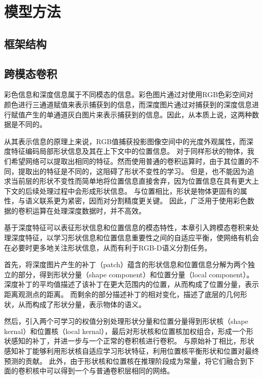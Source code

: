 \section{模型方法}



\subsection{框架结构}



\subsection{跨模态卷积}
彩色信息和深度信息属于不同模态的信息。彩色图片通过对使用RGB色彩空间对颜色进行三通道赋值来表示捕获到的信息，而深度图片通过对捕获到的深度信息进行赋值产生的单通道灰白图片来表示捕获到的信息。因此，从本质上说，这两种数据是不同的。

从其表示信息的原理上来说，RGB值捕获投影图像空间中的光度外观属性，而深度特征编码局部形状信息及其在上下文中的位置信息。
对于同样形状的物体，我们希望网络可以提取出相同的特征。然而使用普通的卷积运算时，由于其位置的不同，提取出的特征是不同的，这阻碍了形状不变性的学习。
但是，也不能因为追求当前层的形状不变性而简单地将位置信息直接舍弃，因为位置信息在具有更大上下文的后续处理过程中会形成形状信息。
与位置相比，形状是物体更固有的属性，与语义联系更为紧密，因而对分割精度更关键。
因此，广泛用于使用彩色数据的卷积运算在处理深度数据时，并不高效。


基于深度特征可以表征形状信息和位置信息的模态特性，本章引入跨模态卷积来处理深度特征，以学习形状信息和位置信息重要性之间的自适应平衡，使网络有机会在必要时更多地关注形状信息，从而有利于RGB-D语义分割任务。

首先，将深度图片产生的补丁（patch）蕴含的形状信息和位置信息分解为两个独立的部分，得到形状分量（shape component）和位置分量（local component）。
深度补丁的平均值描述了该补丁在更大范围内的位置，从而构成了位置分量，表示距离观测点的距离。
而剩余的部分描述补丁的相对变化，描述了底层的几何形状，从而构成了形状分量，表示物体的语义。

然后，引入两个可学习的权值分别处理形状分量和位置分量得到形状核（shape kernal）和位置核（local kernal），最后对形状核和位置核加权组合，形成一个形状感知的补丁，并进一步与一个正常的卷积核进行卷积。
与原始补丁相比，形状感知补丁能够利用形状核自适应学习形状特征，利用位置核平衡形状和位置对最终预测的贡献。
此外，由于形状核和位置核在推理阶段成为常量，将它们融合到下面的卷积核中可以得到一个与普通卷积层相同的网络。


